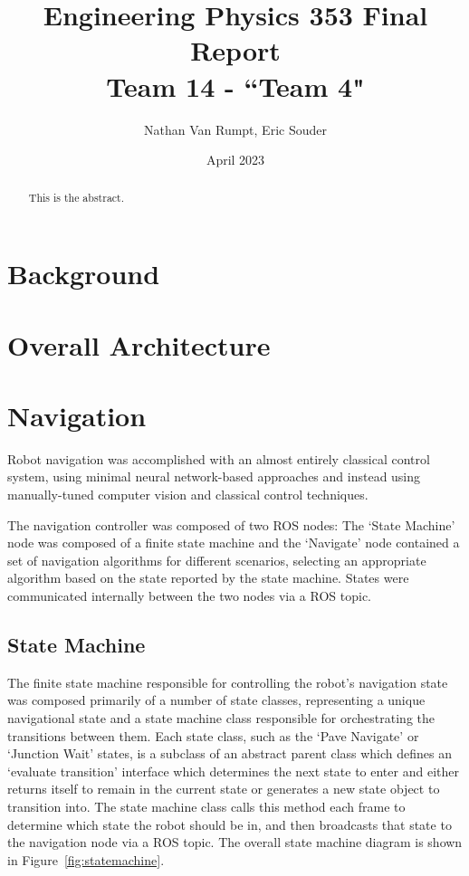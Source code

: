 \documentclass[titlepage, twocolumn]{article}
\title{%
    Engineering Physics 353 Final Report \\
    \large Team 14 - ``Team 4"}
\author{Nathan Van Rumpt, Eric Souder}
\date{April 2023}
\begin{document}
\maketitle

\begin{abstract}
    This is the abstract.
\end{abstract}

\section{Background}

\section{Overall Architecture}

\section{Navigation}
    Robot navigation was accomplished with an almost entirely classical control system, using minimal neural network-based approaches and instead using manually-tuned computer vision and classical control techniques. 

    The navigation controller was composed of two ROS nodes: The `State Machine' node was composed of a finite state machine and the `Navigate' node contained a set of navigation algorithms for different scenarios, selecting an appropriate algorithm based on the state reported by the state machine. States were communicated internally between the two nodes via a ROS topic.
    
    \subsection{State Machine}
        The finite state machine responsible for controlling the robot's navigation state was composed primarily of a number of state classes, representing a unique navigational state and a state machine class responsible for orchestrating the transitions between them. Each state class, such as the `Pave Navigate' or `Junction Wait' states, is a subclass of an abstract parent class which defines an `evaluate transition' interface which determines the next state to enter and either returns itself to remain in the current state or generates a new state object to transition into. The state machine class calls this method each frame to determine which state the robot should be in, and then broadcasts that state to the navigation node via a ROS topic. The overall state machine diagram is shown in Figure~\ref{fig:statemachine}.
\end{document}

